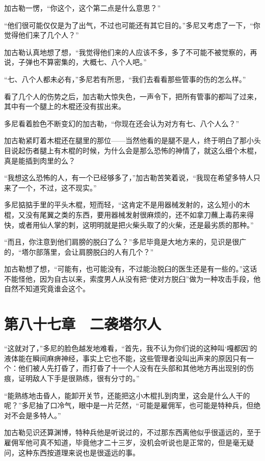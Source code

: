 加古勒一愣，“你这个，这个第二点是什么意思？”

“他们很可能仅仅是为了出气，不过也可能还有其它目的。”多尼又考虑了一下，“你觉得他们来了几个人？”

加古勒认真地想了想，“我觉得他们来的人应该不多，多了不可能不被觉察的，再说，子弹也不算密集的，大概七、八个人吧。”

“七、八个人都未必有，”多尼若有所思，“我们去看看那些管事的伤的怎么样。”

看了几个人的伤势之后，加古勒大惊失色，一声令下，把所有管事的都叫了过来，其中有一个腿上的木棍还没有拔出来。

多尼看着脸色不断变幻的加古勒，“你现在还会认为对方有七、八个人么？”

加古勒紧盯着木棍还在腿里的那位——当然他看的是腿不是人，终于明白了那小头目说起伤者腿上有木棍的时候，为什么会是那么恐怖的神情了，就这么细个木棍，真是能插到肉里的么？

“我想这么恐怖的人，有一个已经够多了，”加古勒苦笑着说，“我现在希望多特人只来了一个，不过，这不现实。”

多尼掂掂手里的平头木棍，短而轻，“这肯定不是用器械发射的，这么短小的木棍，又没有尾翼之类的东西，要用器械发射很麻烦的，还不如拿刀蘸上毒药来得快，或者用仙人掌的刺，这明明就是把火柴头取了的火柴，还是最劣质的那种。”

“而且，你注意到他们肩膀的脱臼了么？”多尼毕竟是大地方来的，见识是很广的，“塔尔部落里，会让肩膀脱臼的人有几个？”

加古勒想了想，“可能有，也可能没有，不过能治脱臼的医生还是有一些的。”这话不能怪他，因为自古以来，索度男人从没有把“使对方脱臼”做为一种攻击手段，他自然不知道究竟谁会这个。

\section{第八十七章　二袭塔尔人}

“这就对了，”多尼的脸色越发地难看，“首先，我不认为你们说的这种叫‘嘎都因’的液体能在瞬间麻痹神经，事实上它也不能，这些管理者没叫出声来的原因只有一个：他们被人先打昏了，而打昏了十一个人没有在头部和其他地方再出现别的伤痕，证明敌人下手是很熟练，很有分寸的。”

“能熟练地击昏人，能卸开关节，还能把这小木棍扎到肉里，这会是什么人干的呢？”多尼抽了口冷气，眼中是一片茫然，“可能是雇佣军，也可能是特种兵，但绝对不会是多特人。”

加古勒见识还算渊博，特种兵他是听说过的，不过那东西离他似乎很遥远的，至于雇佣军他可真不知道，毕竟他才二十三岁，没机会听说也是正常的，但是毫无疑问，这种东西按道理来说也是很遥远的事。

